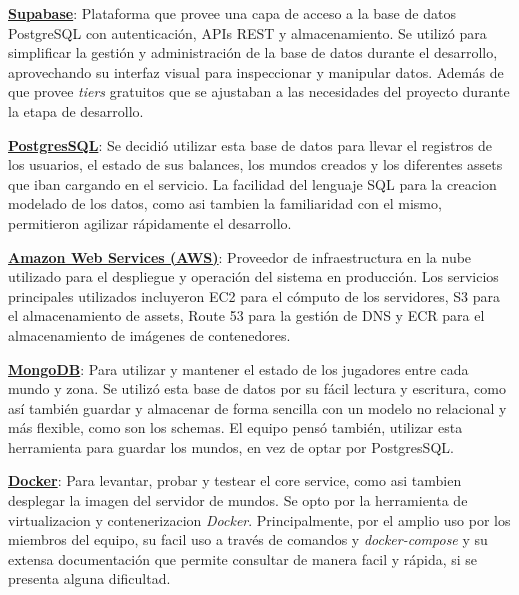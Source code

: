 \vspace{0.25cm}

\textbf{\underline{Supabase}}: Plataforma que provee una capa de acceso a la base de datos PostgreSQL con autenticación, 
APIs REST y almacenamiento. Se utilizó para simplificar la gestión y administración de la base de datos durante 
el desarrollo, aprovechando su interfaz visual para inspeccionar y manipular datos. Además de que provee \textit{tiers} 
gratuitos que se ajustaban a las necesidades del proyecto durante la etapa de desarrollo.

\vspace{0.25cm}

\textbf{\underline{PostgresSQL}}: Se decidió utilizar esta base de datos para llevar el registros de los usuarios, el estado 
de sus balances, los mundos creados y los diferentes assets que iban cargando en el servicio. La facilidad del lenguaje 
SQL para la creacion modelado de los datos, como asi tambien la familiaridad con el mismo, permitieron agilizar rápidamente 
el desarrollo.

\vspace{0.25cm}

\textbf{\underline{Amazon Web Services (AWS)}}: Proveedor de infraestructura en la nube utilizado para el despliegue y 
operación del sistema en producción. Los servicios principales utilizados incluyeron EC2 para el cómputo de los servidores, 
S3 para el almacenamiento de assets, Route 53 para la gestión de DNS y ECR para el almacenamiento de imágenes de contenedores.

\vspace{0.25cm}

\textbf{\underline{MongoDB}}: Para utilizar y mantener el estado de los jugadores entre cada mundo y zona. Se utilizó esta 
base de datos por su fácil lectura y escritura, como así también guardar y almacenar de forma sencilla con un modelo no relacional 
y más flexible, como son los schemas. El equipo pensó también, utilizar esta herramienta para guardar los mundos, en vez 
de optar por PostgresSQL.

\vspace{0.25cm}

\textbf{\underline{Docker}}: Para levantar, probar y testear el core service, como asi tambien desplegar
la imagen del servidor de mundos. Se opto por la herramienta de virtualizacion y contenerizacion \textit{Docker}. Principalmente,
por el amplio uso por los miembros del equipo, su facil uso a través de comandos y \textit{docker-compose} y su extensa
documentación que permite consultar de manera facil y rápida, si se presenta alguna dificultad.

